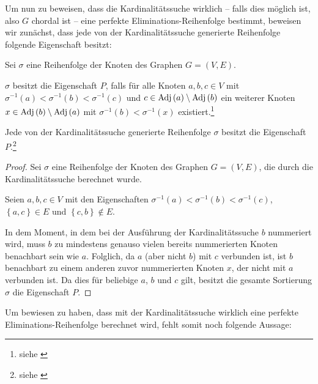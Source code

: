 Um nun zu beweisen, dass die Kardinalitätssuche wirklich -- falls dies möglich ist, also \( G \) chordal ist -- eine perfekte Eliminations-Reihenfolge bestimmt, beweisen wir zunächst, dass jede von der Kardinalitätssuche generierte Reihenfolge folgende Eigenschaft besitzt:

\begin{definition}[Reihenfolgeneigenschaft \( P \)]
	Sei \( \sigma \) eine Reihenfolge der Knoten des Graphen \( G = \left( V, E \right) \).

	\( \sigma\) besitzt die Eigenschaft \( P \), falls für alle Knoten \( a, b, c \in V \) mit \( \sigma^{-1} \left( a \right) < \sigma^{-1} \left( b \right) < \sigma^{-1} \left( c \right)\) und \( c \in \textnormal{Adj} \left( a \right) \setminus \textnormal{Adj} \left( b \right) \) ein weiterer Knoten \( x \in \textnormal{Adj} \left( b \right) \setminus \textnormal{Adj} \left( a \right) \) mit \( \sigma^{-1} \left( b \right) < \sigma^{-1} \left( x \right) \) existiert.\footnote{siehe \cite[Lemma 4]{tarjanyannakakis}}
\end{definition}

\begin{theorem}
	Jede von der Kardinalitätssuche generierte Reihenfolge \( \sigma \) besitzt die Eigenschaft \( P \).\footnote{siehe \cite[Satz 2]{tarjanyannakakis}}
	\label{theorem:mcserfuelltp}
\end{theorem}

\begin{proof}
	Sei \( \sigma \) eine Reihenfolge der Knoten des Graphen \( G = \left( V, E \right) \), die durch die Kardinalitätssuche berechnet wurde.

	Seien \( a, b, c \in V \) mit den Eigenschaften \( \sigma^{-1}\left( a \right) < \sigma^{-1}\left( b \right) < \sigma^{-1}\left( c \right) \),  \( \left\lbrace a, c \right\rbrace \in E \) und \( \left\lbrace c, b \right\rbrace \not\in E \).

	In dem Moment, in dem bei der Ausführung der Kardinalitätssuche \( b \) nummeriert wird, muss \( b \) zu mindestens genauso vielen bereits nummerierten Knoten benachbart sein wie \( a \).  Folglich, da \( a \) (aber nicht \( b \)) mit \( c \) verbunden ist, ist \( b \) benachbart zu einem anderen zuvor nummerierten Knoten \( x\), der nicht mit \( a \) verbunden ist. Da dies für beliebige \( a \), \( b \) und \( c \) gilt, besitzt die gesamte Sortierung \( \sigma\) die Eigenschaft \( P \).
\end{proof}

Um bewiesen zu haben, dass mit der Kardinalitätssuche wirklich eine perfekte Eliminations-Rei\-hen\-fol\-ge berechnet wird, fehlt somit noch folgende Aussage:

